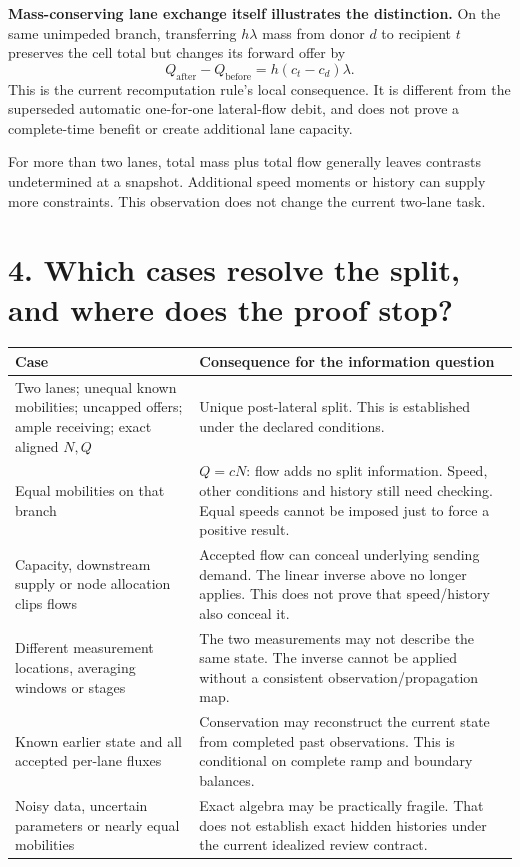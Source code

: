 \documentclass[11pt]{article}
\begin{document}
\textbf{Mass-conserving lane exchange itself illustrates the distinction.}
On the same unimpeded branch, transferring \(h\lambda\) mass from donor \(d\)
to recipient \(t\) preserves the cell total but changes its forward offer by
\[
 Q_{\mathrm{after}}-Q_{\mathrm{before}}
   =h(c_t-c_d)\lambda.
\]
This is the current recomputation rule's local consequence. It is different
from the superseded automatic one-for-one lateral-flow debit, and does not
prove a complete-time benefit or create additional lane capacity.

For more than two lanes, total mass plus total flow generally leaves contrasts
undetermined at a snapshot. Additional speed moments or history can supply more
constraints. This observation does not change the current two-lane task.

\newpage
\section*{4. Which cases resolve the split, and where does the proof stop?}
\renewcommand{\arraystretch}{1.22}
\begin{tabular}{@{}>{\raggedright\arraybackslash}p{}>{\raggedright\arraybackslash}p{}@{}}
\toprule
Case & Consequence for the information question\\
\midrule
Two lanes; unequal known mobilities; uncapped offers; ample receiving; exact aligned \(N,Q\)
& Unique post-lateral split. This is established under the declared conditions.\\
Equal mobilities on that branch
& \(Q=cN\): flow adds no split information. Speed, other conditions and history still need checking. Equal speeds cannot be imposed just to force a positive result.\\
Capacity, downstream supply or node allocation clips flows
& Accepted flow can conceal underlying sending demand. The linear inverse above no longer applies. This does not prove that speed/history also conceal it.\\
Different measurement locations, averaging windows or stages
& The two measurements may not describe the same state. The inverse cannot be applied without a consistent observation/propagation map.\\
Known earlier state and all accepted per-lane fluxes
& Conservation may reconstruct the current state from completed past observations. This is conditional on complete ramp and boundary balances.\\
Noisy data, uncertain parameters or nearly equal mobilities
& Exact algebra may be practically fragile. That does not establish exact hidden histories under the current idealized review contract.\\
\bottomrule
\end{tabular}
\end{document}

